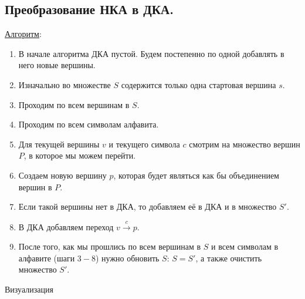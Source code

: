 \subsection{%
  Преобразование НКА в ДКА.%
}

\underline{Алгоритм}:
\begin{enumerate}
  \item В начале алгоритма ДКА пустой. Будем постепенно по одной добавлять в
  него новые вершины.
  
  \item Изначально во множестве \(S\) содержится только одна стартовая вершина
  \(s\).

  \item Проходим по всем вершинам в \(S\).
  
  \item Проходим по всем символам алфавита.
  
  \item Для текущей вершины \(v\) и текущего символа \(c\) смотрим на множество
  вершин \(P\), в которое мы можем перейти.

  \item Создаем новую вершину \(p\), которая будет являться как бы объединением
  вершин в \(P\).

  \item Если такой вершины нет в ДКА, то добавляем её в ДКА и в множество
  \(S'\).

  \item В ДКА добавляем переход \(v \xrightarrow{c} p\).
  
  \item После того, как мы прошлись по всем вершинам в \(S\) и всем символам в 
  алфавите (шаги \(3-8\)) нужно обновить \(S\): \(S = S'\), а также очистить
  множество \(S'\).
\end{enumerate}

\todo Визуализация
